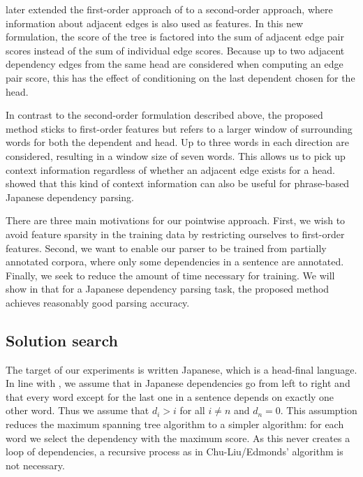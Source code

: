 \documentclass[english]{jnlp_1.4}
\def\secref#1{}
\begin{document}
 later extended the first-order approach of
 to a second-order approach, where information
about adjacent edges is also used as features. In this new formulation, the
score of the tree is factored into the sum of adjacent edge pair
scores instead of the sum of individual edge scores. Because up to two
adjacent dependency edges from the same head are considered when
computing an edge pair score, this has the effect of conditioning on
the last dependent chosen for the head.

In contrast to the second-order formulation described above, the
proposed method sticks to first-order features but refers to a larger
window of surrounding words for both the dependent and head. Up to
three words in each direction are considered, resulting in a window
size of seven words. This allows us to pick up context information
regardless of whether an adjacent edge exists for a
head.  showed that this kind of context
information can also be useful for phrase-based Japanese dependency
parsing.

There are three main motivations for our pointwise approach. First, we
wish to avoid feature sparsity in the training data by restricting
ourselves to first-order features. Second, we want to enable our
parser to be trained from partially annotated corpora, where only some
dependencies in a sentence are annotated. Finally, we seek to reduce
the amount of time necessary for training. We will show in
\secref{sec:withFAC} that for a Japanese dependency parsing task, the
proposed method achieves reasonably good parsing accuracy.


\subsection{Solution search}
\label{sec:solution-search}

The target of our experiments is written Japanese, which is a
head-final language. In line with , we
assume that in Japanese dependencies go from left to right and that
every word except for the last one in a sentence depends on exactly
one other word. Thus we assume that $d_i>i$ for all $i\ne n$ and
$d_n=0$. This assumption reduces the maximum spanning tree algorithm
to a simpler algorithm: for each word we select the dependency with
the maximum score. As this never creates a loop of dependencies, a
recursive process as in Chu-Liu/Edmonds' algorithm is not necessary.
\end{document}
